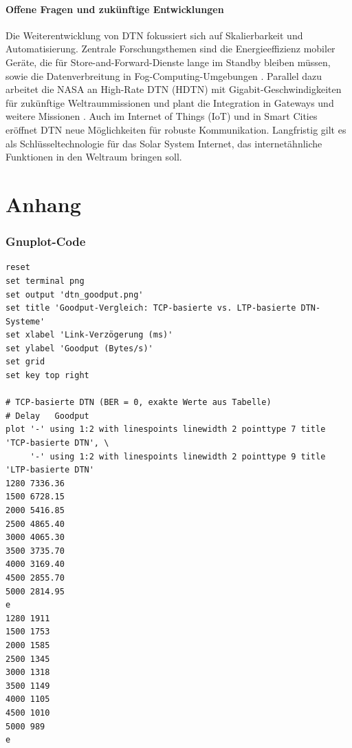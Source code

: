 \documentclass[paper=a4,fontsize=12pt,ngerman]{scrartcl}
\begin{document}
\subsection{Offene Fragen und zukünftige Entwicklungen}
 Die Weiterentwicklung von DTN fokussiert sich auf Skalierbarkeit und Automatisierung.
 Zentrale Forschungsthemen sind die Energieeffizienz mobiler Geräte, die für Store-and-Forward-Dienste lange im Standby bleiben müssen, sowie die Datenverbreitung in Fog-Computing-Umgebungen \cite[S. 84-85]{GYL+15}. 
 Parallel dazu arbeitet die NASA an High-Rate DTN (HDTN) mit Gigabit-Geschwindigkeiten für zukünftige Weltraummissionen und plant die Integration in Gateways und weitere Missionen \cite{DRT+24}.
 Auch im Internet of Things (IoT) und in Smart Cities eröffnet DTN neue Möglichkeiten für robuste Kommunikation. 
 Langfristig gilt es als Schlüsseltechnologie für das Solar System Internet, das internetähnliche Funktionen in den Weltraum bringen soll.\cite{Fall03}

\clearpage
\renewcommand\refname{Literaturverzeichnis}




\clearpage
\appendix
\part*{Anhang}

\section{Gnuplot-Code}
\begin{lstlisting}[language=Gnuplot, caption={Gnuplot-Skript zur Erstellung der Goodput-Grafik.}, label={lst:gnuplot-code}, basicstyle=\footnotesize]
reset
set terminal png
set output 'dtn_goodput.png'
set title 'Goodput-Vergleich: TCP-basierte vs. LTP-basierte DTN-Systeme'
set xlabel 'Link-Verzögerung (ms)'
set ylabel 'Goodput (Bytes/s)'
set grid
set key top right

# TCP-basierte DTN (BER = 0, exakte Werte aus Tabelle)
# Delay   Goodput
plot '-' using 1:2 with linespoints linewidth 2 pointtype 7 title 'TCP-basierte DTN', \
     '-' using 1:2 with linespoints linewidth 2 pointtype 9 title 'LTP-basierte DTN'
1280 7336.36
1500 6728.15
2000 5416.85
2500 4865.40
3000 4065.30
3500 3735.70
4000 3169.40
4500 2855.70
5000 2814.95
e
1280 1911
1500 1753
2000 1585
2500 1345
3000 1318
3500 1149
4000 1105
4500 1010
5000 989
e

\end{lstlisting}
\end{document}
